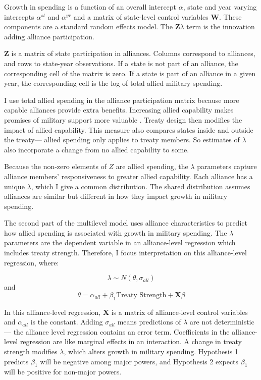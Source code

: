 \documentclass[12pt]{article}
\begin{document}
Growth in spending is a function of an overall intercept $\alpha$, state and year varying intercepts $\alpha^{st}$ and $\alpha^{yr}$ and a matrix of state-level control variables $\textbf{W}$.
These components are a standard random effects model. 
The $\textbf{Z} \lambda$ term is the innovation adding alliance participation.


$\textbf{Z}$ is a matrix of state participation in alliances. 
Columns correspond to alliances, and rows to state-year observations. 
If a state is not part of an alliance, the corresponding cell of the matrix is zero.
If a state is part of an alliance in a given year, the corresponding cell is the log of total allied military spending. 


I use total allied spending in the alliance participation matrix because more capable alliances provide extra benefits.
Increasing allied capability makes promises of military support more valuable \citep{Johnsonetal2015}.  
Treaty design then modifies the impact of allied capability.   
This measure also compares states inside and outside the treaty--- allied spending only applies to treaty members. 
So estimates of $\lambda$ also incorporate a change from no allied capability to some. 

Because the non-zero elements of $Z$ are allied spending, the $\lambda$ parameters capture alliance members' responsiveness to greater allied capability. 
Each alliance has a unique $\lambda$, which I give a common distribution. 
The shared distribution assumes alliances are similar but different in how they impact growth in military spending. 


The second part of the multilevel model uses alliance characteristics to predict how allied spending is associated with growth in military spending. 
The $\lambda$ parameters are the dependent variable in an alliance-level regression which includes treaty strength.
Therefore, I focus interpretation on this alliance-level regression, where: 

\begin{equation}
\lambda \sim N(\theta, \sigma_{all})
\end{equation} 
and 
\begin{equation}
\theta = \alpha_{all} + \beta_1 \mbox{Treaty Strength} + \textbf{X} \beta
\end{equation}

In this alliance-level regression, $\textbf{X}$ is a matrix of alliance-level control variables and $\alpha_{all}$ is the constant.
Adding $\sigma_{all}$ means predictions of $\lambda$ are not deterministic--- the alliance level regression contains an error term. 
Coefficients in the alliance-level regression are like marginal effects in an interaction. 
A change in treaty strength modifies $\lambda$, which alters growth in military spending.
Hypothesis 1 predicts $\beta_1$ will be negative among major powers, and Hypothesis 2 expects $\beta_1$ will be positive for non-major powers.  
\end{document}
